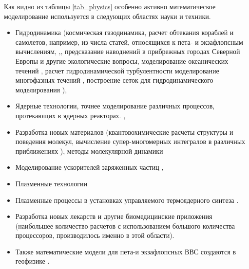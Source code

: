 Как видно из таблицы \ref{tab_physics} особенно активно математическое моделирование используется в следующих областях науки и техники.  
\begin{itemize}
	\item Гидродинамика (космическая газодинамика, расчет обтекания кораблей и самолетов, например, из числа статей, относящихся к пета- и экзафлопсным вычислениям, \cite{Onishi2014},\cite{Lu2015,Peterson1989}, предсказание наводнений в прибрежных городах Северной Европы и другие экологические вопросы, моделирование океанических течений \cite{STERN20151,Newman20152086,Reuter2015325,Walker2014287}, расчет гидродинамической турбулентности %
	\cite{Mininni2011316,Appeloe201019,Yokota2013445,Tucker2016,Kotov2016189}  моделирование многофазных течений \cite{Safi2016170,Zaspel2016505}, построение сеток для гидродинамического моделирования \cite{Shang2013381,Yilmaz2013388,Ono20142336,Yilmaz2013773}),
	\item Ядерные технологии, точнее моделирование различных процессов, протекающих в ядерных реакторах. \cite{Romano2013274,Romano201320,Romano201590,Boyd201443,Gong2012588,Gong20116010,Bergmann2015176,Bauge201432}, 
	\item Разработка новых материалов (квантовохимические расчеты структуры и поведения молекул, вычисление супер-многомерных интегралов в различных приближениях \cite{Ono2015}), методы молекулярной динамики \cite{Valiev20101477,Aguilar20132197,Yokota201317,Ohno20142575,Xu2015200}
	\item Моделирование ускорителей заряженных частиц \cite{Silva2014229}, 
	\item Плазменные технологии\cite{BirdsallIEEE}
	\item Плазменные процессы в установках управляемого термоядерного синтеза
	\cite{KatesHarbeck2016231,Winkel2015456,Minoshima201381,Kumar20132251,Decyk2014,Acebron2013224}. 
	\item Разработка новых лекарств и другие биомедицинские приложения \cite{Stone2015,Joshi2011200,Saraladevi2015596,Blau20132856,Wang2012254,Markram201139,Markowitz2015730} (наибольшее количество расчетов с использованием большого количества процессоров, производилось именно в этой области). 
	
	\item Также математические модели для пета-и экзафлопсных ВВС создаются в геофизике \cite{Christen2012956,Nakajima20131265,Zhong2015197,Reed20131,Hodges201316,Furumura20111448}.
\end{itemize}

